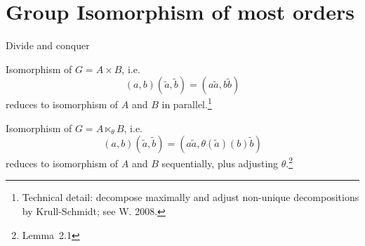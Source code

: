 \documentclass{beamer}
\begin{document}
\section{Group Isomorphism of most orders}

\begin{frame}{Divide and conquer}

Isomorphism of $G=A\times B$, i.e.
\[(a,b)(\tilde{a},\tilde{b}) = (a\tilde{a},b\tilde{b})\] reduces to isomorphism
of $A$ and $B$ in parallel.\footnote{Technical detail: decompose maximally and
adjust non-unique decompositions by Krull-Schmidt; see W. 2008.}
\pause

Isomorphism of $G=A\ltimes_{\theta} B$, i.e.
\[(a,b)(\tilde{a},\tilde{b})=(a\tilde{a},\theta(\tilde{a})(b)\tilde{b})\]
reduces to isomorphism of $A$ and $B$
sequentially, plus adjusting $\theta$.\footnote{Lemma~2.1}

\end{frame}







\end{document}
